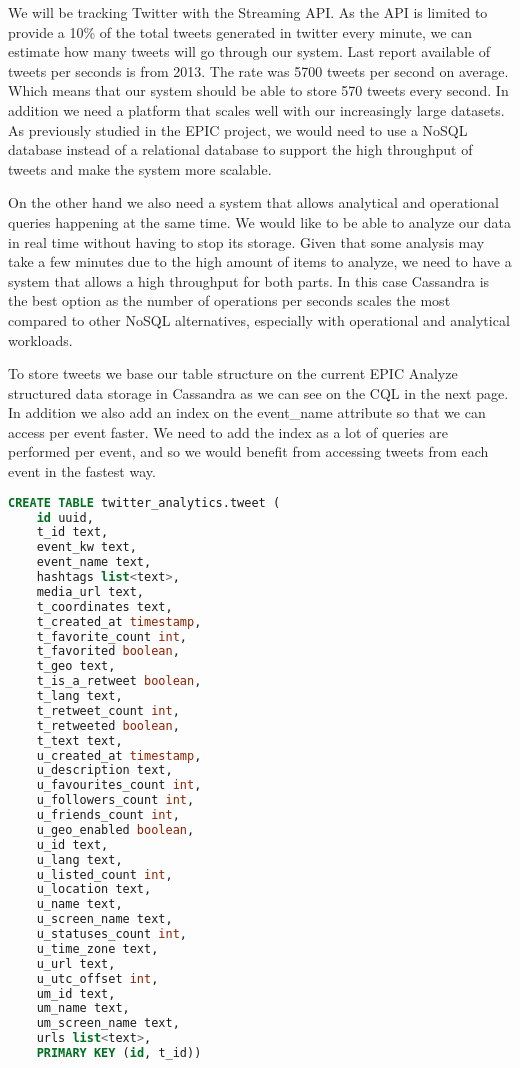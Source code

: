We will be tracking Twitter with the Streaming API. As the API is limited to provide a 10\% of the total tweets generated in twitter every minute, we can estimate how many tweets will go through our system. Last report available of tweets per seconds is from 2013. The rate was 5700 tweets\parencite{tweetsRecord} per second on average.  Which means that our system should be able to store 570 tweets every second. In addition we need a platform that scales well with our increasingly large datasets. As previously studied in the EPIC project\parencite{mySQLnoSQL},  we would need to use a NoSQL database instead of a relational database to support the high throughput of tweets and make the system more scalable.

 
On the other hand we also need a system that allows analytical and operational queries happening at the same time. We would like to be able to analyze our data in real time without having to stop its storage. Given that some analysis may take a few minutes due to the high amount of items to analyze, we need to  have a system that allows a high throughput for both parts. In this case Cassandra is the best option as the number of operations per seconds scales the most compared to other NoSQL alternatives, especially with operational and analytical workloads\parencite{benchmarkNoSQL}.
 
To store tweets we base our table structure on the current EPIC Analyze structured data storage in Cassandra as we can see on the CQL in the next page. In addition we also add an index on the event\_name attribute so that we can access per event faster. We need to add the index as a lot of queries are performed per event, and so we would benefit from accessing tweets from each event in the fastest way.


\begin{lstlisting}[language=SQL, caption={Tweets CQL table script}, float, floatplacement=H ]
CREATE TABLE twitter_analytics.tweet (
    id uuid,
    t_id text,
    event_kw text,
    event_name text,
    hashtags list<text>,
    media_url text,
    t_coordinates text,
    t_created_at timestamp,
    t_favorite_count int,
    t_favorited boolean,
    t_geo text,
    t_is_a_retweet boolean,
    t_lang text,
    t_retweet_count int,
    t_retweeted boolean,
    t_text text,
    u_created_at timestamp,
    u_description text,
    u_favourites_count int,
    u_followers_count int,
    u_friends_count int,
    u_geo_enabled boolean,
    u_id text,
    u_lang text,
    u_listed_count int,
    u_location text,
    u_name text,
    u_screen_name text,
    u_statuses_count int,
    u_time_zone text,
    u_url text,
    u_utc_offset int,
    um_id text,
    um_name text,
    um_screen_name text,
    urls list<text>,
    PRIMARY KEY (id, t_id))
\end{lstlisting}


